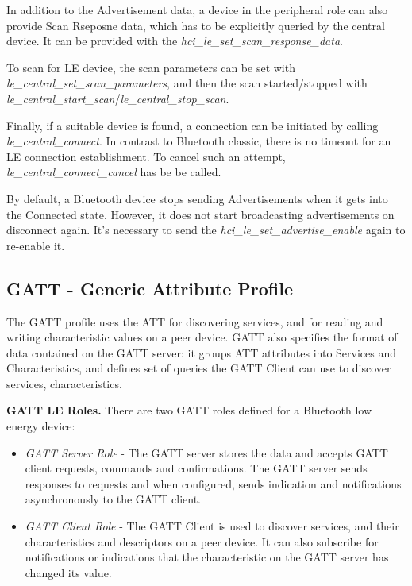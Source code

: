 In addition to the Advertisement data, a device in the peripheral role can also provide Scan Rseposne data, which has to be explicitly queried by the central device. It can be provided with the \emph{hci\_le\_set\_scan\_response\_data}.

To scan for LE device, the scan parameters can be set with \emph{le\_central\_set\_scan\_parameters}, and then the scan started/stopped with \emph{le\_central\_start\_scan}/\emph{le\_central\_stop\_scan}.

Finally, if a suitable device is found, a connection can be initiated by calling \emph{le\_central\_connect}. In contrast to Bluetooth classic, there is no timeout for an LE connection establishment. To cancel such an attempt, \emph{le\_central\_connect\_cancel} has be be called.

By default, a Bluetooth device stops sending Advertisements when it gets into the Connected state. However, it does not start broadcasting advertisements on disconnect again. It's necessary to send the \emph{hci\_le\_set\_advertise\_enable} again to re-enable it.

\subsection{GATT - Generic Attribute Profile}
The GATT profile uses the ATT for discovering services, and for reading and writing characteristic values on a peer device. GATT also specifies the format of data contained on the GATT server: it groups ATT attributes into Services and Characteristics, and defines set of queries the GATT Client can use to discover services, characteristics.

\textbf{GATT LE Roles.}
There are two GATT roles defined for a Bluetooth low energy device:
\begin{itemize}
\item \emph{GATT Server Role} - The GATT server stores the data and accepts GATT client requests, commands and confirmations. The GATT server sends responses to requests and when configured, sends indication and notifications asynchronously to the GATT client. 
\item \emph{GATT Client Role} - The GATT Client is used to discover services, and their characteristics and descriptors on a peer device. It can also subscribe for notifications or indications that the characteristic on the GATT server has changed its value. 
\end{itemize}

